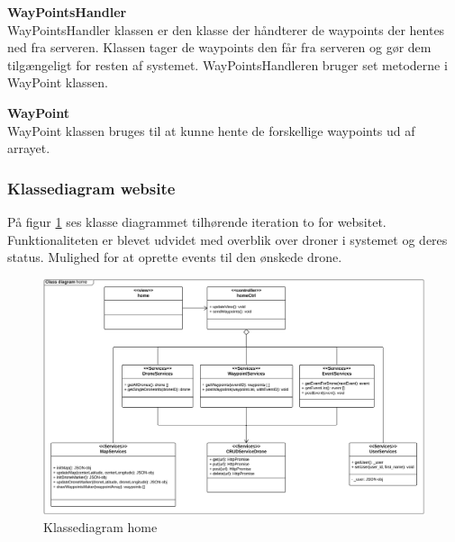 \textbf{WayPointsHandler} \\
WayPointsHandler klassen er den klasse der håndterer de waypoints der hentes ned fra serveren. Klassen tager de waypoints den får fra serveren og gør dem tilgængeligt for resten af systemet. WayPointsHandleren bruger set metoderne i WayPoint klassen.

\textbf{WayPoint} \\
WayPoint klassen bruges til at kunne hente de forskellige waypoints ud af arrayet.  


\subsubsection*{Klassediagram website}
\vspace{-0.1cm}
På figur \ref{fig:classDiagram_home} ses klasse diagrammet tilhørende iteration to for websitet. Funktionaliteten er blevet udvidet med overblik over droner i systemet og deres status. Mulighed for at oprette events til den ønskede drone. 
\begin{figure}[H]
	\centering
	\includegraphics[width=1.\textwidth]{Billeder/klasse_diagrammer/home_class_diagram.png}
	\vspace{-0.5cm}
	\caption{Klassediagram home}
	\label{fig:classDiagram_home}
\end{figure}
